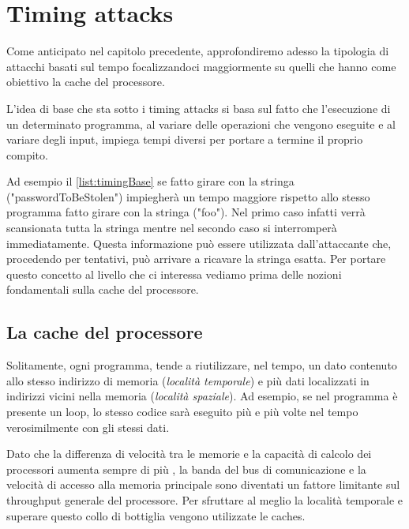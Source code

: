 \chapter{Timing attacks}
	Come anticipato nel capitolo precedente, approfondiremo adesso la tipologia di attacchi basati sul tempo focalizzandoci maggiormente su quelli che hanno come obiettivo la cache del processore. 
	
	L'idea di base che sta sotto i timing attacks si basa sul fatto che l'esecuzione di un determinato programma, al variare delle operazioni che vengono eseguite e al variare degli input, impiega tempi diversi per portare a termine il proprio compito.
	
	
		
	Ad esempio il \cref{list:timingBase} se fatto girare con la stringa ("passwordToBeStolen") impiegherà un tempo maggiore rispetto allo stesso programma fatto girare con la stringa ("foo"). Nel primo caso infatti verrà scansionata tutta la stringa mentre nel secondo caso si interromperà immediatamente. Questa informazione può essere utilizzata dall'attaccante che, procedendo per tentativi, può arrivare a ricavare la stringa esatta. Per portare questo concetto al livello che ci interessa vediamo prima delle nozioni fondamentali sulla cache del processore. 
	
	\section{La cache del processore}
		Solitamente, ogni programma, tende a riutilizzare, nel tempo, un dato contenuto allo stesso indirizzo di memoria (\emph{località temporale}) e più dati localizzati in indirizzi vicini nella memoria (\emph{località spaziale}). Ad esempio, se nel programma è presente un loop, lo stesso codice sarà eseguito più e più volte nel tempo verosimilmente con gli stessi dati.
		
		Dato che la differenza di velocità tra le memorie e la capacità di calcolo dei processori aumenta sempre di più \cite{hennessy2011computer}, la banda del bus di comunicazione e la velocità di accesso alla memoria principale sono diventati un fattore limitante sul throughput generale del processore. Per sfruttare al meglio la località temporale e superare questo collo di bottiglia vengono utilizzate le caches. 
		
